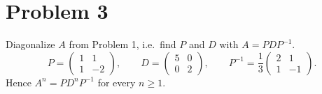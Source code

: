 \documentclass[12pt]{article}
\begin{document}
\section*{Problem 3}
Diagonalize $A$ from Problem 1, i.e.\ find $P$ and $D$ with $A = PDP^{-1}$.
\[
P = \begin{pmatrix} 1 & 1 \\ 1 & -2 \end{pmatrix}, \qquad
D = \begin{pmatrix} 5 & 0 \\ 0 & 2 \end{pmatrix}, \qquad
P^{-1} = \frac{1}{3}\begin{pmatrix} 2 & 1 \\ 1 & -1 \end{pmatrix}.
\]
Hence $A^{n} = P D^{n} P^{-1}$ for every $n \ge 1$.
\end{document}
